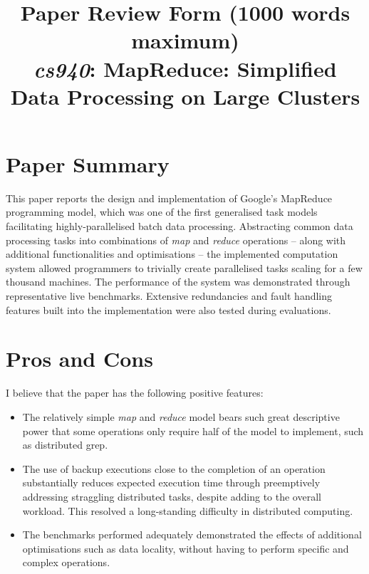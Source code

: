 \documentclass[11pt]{article}
\begin{document}
\title{Paper Review Form (1000 words maximum)\\
  \emph{cs940}: MapReduce: Simplified Data Processing on Large Clusters \cite{dean2008mapreduce}}
\maketitle

\section*{Paper Summary}
This paper reports the design and implementation of Google's MapReduce programming model, which was one of the first generalised task models facilitating highly-parallelised batch data processing. Abstracting common data processing tasks into combinations of \emph{map} and \emph{reduce} operations -- along with additional functionalities and optimisations -- the implemented computation system allowed programmers to trivially create parallelised tasks scaling for a few thousand machines. The performance of the system was demonstrated through representative live benchmarks. Extensive redundancies and fault handling features built into the implementation were also tested during evaluations. 

\section*{Pros and Cons}

I believe that the paper has the following positive features:
\begin{itemize}
	\item The relatively simple \emph{map} and \emph{reduce} model bears such great descriptive power that some operations only require half of the model to implement, such as distributed grep.
	\item The use of backup executions close to the completion of an operation substantially reduces expected execution time through preemptively addressing straggling distributed tasks, despite adding to the overall workload. This resolved a long-standing difficulty in distributed computing.
	\item The benchmarks performed adequately demonstrated the effects of additional optimisations such as data locality, without having to perform specific and complex operations.
\end{itemize}
\end{document}
